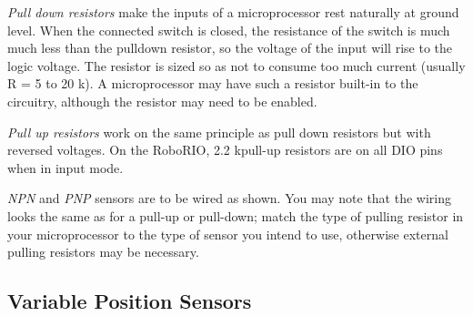 \begin{asparaenum}[a)]
\item \textit{Pull down resistors} make the inputs of a microprocessor rest naturally at ground level. When the connected switch is closed, the resistance of the switch is much much less than the pulldown resistor, so the voltage of the input will rise to the logic voltage. The resistor is sized so as not to consume too much current (usually R = 5 to 20 k\Omega). A microprocessor may have such a resistor built-in to the circuitry, although the resistor may need to be enabled.
\item \textit{Pull up resistors} work on the same principle as pull down resistors but with reversed voltages. On the RoboRIO, 2.2 k\Omega pull-up resistors are on all DIO pins when in input mode.
\item \textit{NPN} and \textit{PNP} sensors are to be wired as shown. You may note that the wiring looks the same as for a pull-up or pull-down; match the type of pulling resistor in your microprocessor to the type of sensor you intend to use, otherwise external pulling resistors may be necessary.
\end{asparaenum}




\subsection{Variable Position Sensors}
\begin{figure}[H]
\begin{subfigure}[b]{.33\linewidth}
\end{subfigure}\begin{subfigure}[b]{.33\linewidth}
\end{subfigure}\begin{subfigure}[b]{.33\linewidth}
\end{subfigure}
\end{figure}

